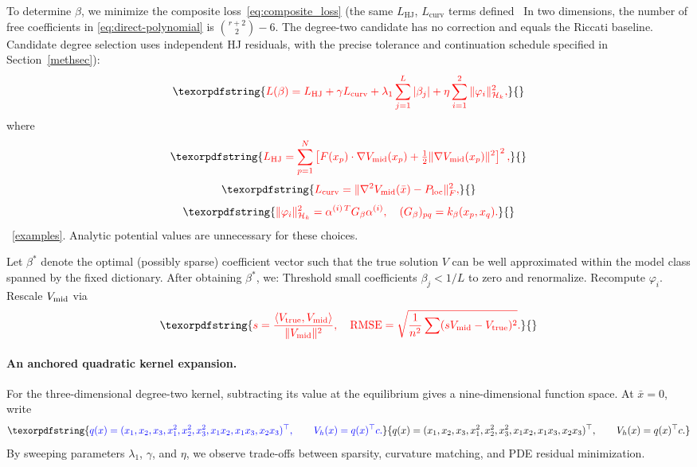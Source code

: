 \documentclass[11pt]{article}
\theoremstyle{plain}      %
\theoremstyle{definition} %
\providecommand{\DIFaddtex}[1]{{\protect\color{blue}#1}} %
\providecommand{\DIFdeltex}[1]{{\protect\color{red}#1}} %
\providecommand{\DIFaddbegin}{} %
\providecommand{\DIFaddend}{} %
\providecommand{\DIFdelbegin}{} %
\providecommand{\DIFdelend}{} %
\providecommand{\DIFadd}[1]{\texorpdfstring{\DIFaddtex{#1}}{#1}} %
\providecommand{\DIFdel}[1]{\texorpdfstring{\DIFdeltex{#1}}{}} %
\newcommand{\DIFscaledelfig}{1.0}
\newlength{\DIFdelgraphicswidth} %
\newlength{\DIFdelgraphicsheight} %
\newcommand{\DIFaddincludegraphics}[2][]{{\color{blue}\fbox{\DIFOincludegraphics[#1]{#2}}}} %
\newcommand{\DIFdelincludegraphics}[2][]{%
\sbox{\DIFdelgraphicsbox}{\DIFOincludegraphics[#1]{#2}}%
\settoboxwidth{\DIFdelgraphicswidth}{\DIFdelgraphicsbox} %
\settoboxtotalheight{\DIFdelgraphicsheight}{\DIFdelgraphicsbox} %
\scalebox{\DIFscaledelfig}{%
\parbox[b]{\DIFdelgraphicswidth}{\usebox{\DIFdelgraphicsbox}\\[-\baselineskip] \rule{\DIFdelgraphicswidth}{0em}}\llap{\resizebox{\DIFdelgraphicswidth}{\DIFdelgraphicsheight}{%
\setlength{\unitlength}{\DIFdelgraphicswidth}%
\begin{picture}(1,1)%
\thicklines\linethickness{2pt} %
{\color[rgb]{1,0,0}\put(0,0){\framebox(1,1){}}}%
{\color[rgb]{1,0,0}\put(0,0){\line( 1,1){1}}}%
{\color[rgb]{1,0,0}\put(0,1){\line(1,-1){1}}}%
\end{picture}%
}\hspace*{3pt}}} %
} %
\DeclareRobustCommand{\DIFaddbegin}{\DIFOaddbegin \let\includegraphics\DIFaddincludegraphics} %
\DeclareRobustCommand{\DIFaddend}{\DIFOaddend \let\includegraphics\DIFOincludegraphics} %
\DeclareRobustCommand{\DIFdelbegin}{\DIFOdelbegin \let\includegraphics\DIFdelincludegraphics} %
\DeclareRobustCommand{\DIFdelend}{\DIFOaddend \let\includegraphics\DIFOincludegraphics} %
\begin{document}
\DIFdel{To determine \( \beta \), we minimize the composite loss~\eqref{eq:composite_loss} (the same $L_{\text{HJ}}$, $L_{\text{curv}}$ terms defined }\DIFdelend\ \DIFaddbegin \DIFadd{In two dimensions, the number of free coefficients in \eqref{eq:direct-polynomial} is $\binom{r+2}{2}-6$. The degree-two candidate has no correction and equals the Riccati baseline. Candidate degree selection uses independent HJ residuals, with the precise tolerance and continuation schedule specified }\DIFaddend in Section~\DIFdelbegin \DIFdel{\ref{methsec}):
}\[
\DIFdel{L(\beta) = L_{\text{HJ}} + \gamma L_{\text{curv}} + \lambda_1 \sum_{j=1}^L |\beta_j| + \eta \sum_{i=1}^2 \|\varphi_i\|_{\mathcal{H}_k}^2,
}\]%
\DIFdel{where
}\[
\DIFdel{L_{\text{HJ}} = \sum_{p=1}^N \left[ F(x_p) \cdot \nabla V_{\text{mid}}(x_p)
+ \tfrac12 \|\nabla V_{\rm mid}(x_p)\|^2 \right]^2,
}\]%
\[
\DIFdel{L_{\text{curv}} = \|\nabla^2 V_{\text{mid}}(\bar{x}) - P_{\text{loc}}\|_F^2,
}\]%
\[
\DIFdel{\|\varphi_i\|_{\mathcal{H}_k}^2 = \alpha^{(i)\,T} G_\beta \alpha^{(i)}, \quad (G_\beta)_{pq} = k_\beta(x_p, x_q).
}\]%
\DIFdelend\ \DIFaddbegin \DIFadd{\ref{examples}. Analytic potential values are unnecessary for these choices.
}\DIFaddend 

\DIFdelbegin \DIFdel{Let $\beta^*$ denote the optimal (possibly sparse) coefficient vector such that the true solution $V$ can be well approximated within the model class spanned by the fixed dictionary. After obtaining \( \beta^* \), we:
}%
\DIFdel{Threshold small coefficients \( \beta_j < 1/L \) to zero and renormalize. }%
\DIFdel{Recompute \( \varphi_i \).
  }%
\DIFdel{Rescale \( V_{\rm mid} \) via
    }\[
    \DIFdel{s = \frac{\langle V_{\rm true}, V_{\rm mid} \rangle}{\|V_{\rm mid}\|^2}, \quad
    \text{RMSE} = \sqrt{\frac{1}{n^2} \sum (s V_{\rm mid} - V_{\rm true})^2}.
    }\]%
\DIFdelend \DIFaddbegin \paragraph{\DIFadd{An anchored quadratic kernel expansion.}}
\DIFadd{For the three-dimensional degree-two kernel, subtracting its value at the equilibrium gives a nine-dimensional function space. At $\bar x=0$, write
}\[
 \DIFadd{q(x)=(x_1,x_2,x_3,x_1^2,x_2^2,x_3^2,x_1x_2,x_1x_3,x_2x_3)^\top,
 \qquad V_h(x)=q(x)^\top c.
}\]\DIFaddend 
\DIFdelbegin %
\DIFdel{By sweeping parameters \( \lambda_1 \), \( \gamma \), and \( \eta \), we observe trade-offs between sparsity, curvature matching, and PDE residual minimization. }%
\end{document}

